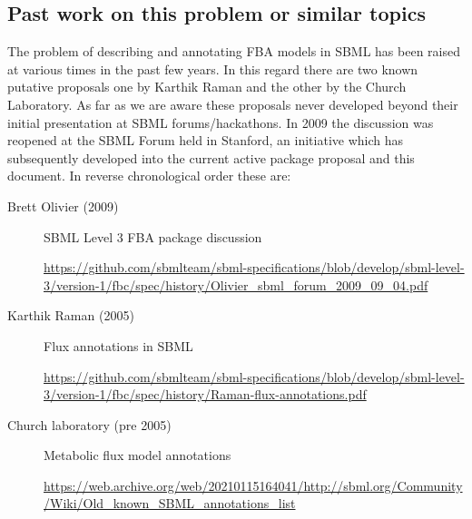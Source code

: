 \subsection{Past work on this problem or similar topics}
The problem of describing and annotating FBA models in SBML has been raised
at various times in the past few years. In this regard there are two known
putative proposals one by Karthik Raman and the other by the Church
Laboratory. As far as we are aware these proposals never developed beyond
their initial presentation at SBML forums/hackathons. In 2009 the discussion
was reopened at the SBML Forum held in Stanford, an initiative which has subsequently developed into the current active package proposal and this document. In reverse chronological order these are:
%
\begin{description}
  \item[Brett Olivier (2009)] SBML Level 3 FBA package discussion
  \item[]\url{https://github.com/sbmlteam/sbml-specifications/blob/develop/sbml-level-3/version-1/fbc/spec/history/Olivier_sbml_forum_2009_09_04.pdf}
  \item[Karthik Raman (2005)] Flux annotations in SBML
  \item[]\url{https://github.com/sbmlteam/sbml-specifications/blob/develop/sbml-level-3/version-1/fbc/spec/history/Raman-flux-annotations.pdf}
  \item[Church laboratory (pre 2005)] Metabolic flux model annotations
  \item[]\url{https://web.archive.org/web/20210115164041/http://sbml.org/Community/Wiki/Old_known_SBML_annotations_list}
\end{description}


